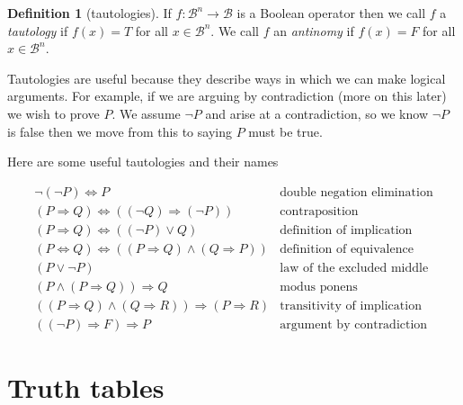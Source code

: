 \documentclass[
]{book}
\theoremstyle{definition}
\newtheorem{definition}{Definition}[chapter]
\theoremstyle{definition}
\theoremstyle{definition}
\theoremstyle{definition}
\theoremstyle{remark}
\begin{document}
\begin{definition}[tautologies]
If \(f: \mathcal{B}^n \rightarrow \mathcal{B}\) is a Boolean operator then we call \(f\) a \emph{tautology} if \(f(x) = T\) for all \(x \in \mathcal{B}^n\). We call \(f\) an \emph{antinomy} if \(f(x) = F\) for all \(x \in \mathcal{B}^n\).
\end{definition}

Tautologies are useful because they describe ways in which we can make logical arguments. For example, if we are arguing by contradiction (more on this later) we wish to prove \(P\). We assume \(\neg P\) and arise at a contradiction, so we know \(\neg P\) is false then we move from this to saying \(P\) must be true.

Here are some useful tautologies and their names

\begin{equation}
\begin{array}{lr}
\neg (\neg P) \Leftrightarrow P & \mbox{double negation elimination}\\
(P \Rightarrow Q) \Leftrightarrow ((\neg Q) \Rightarrow (\neg P)) & \mbox{contraposition}\\
(P \Rightarrow Q) \Leftrightarrow ((\neg P) \vee Q) & \mbox{definition of implication}\\
(P \Leftrightarrow Q) \Leftrightarrow ((P \Rightarrow Q) \wedge (Q \Rightarrow P)) & \mbox{definition of equivalence}\\
(P \vee \neg P) & \mbox{law of the excluded middle}\\
(P \wedge (P \Rightarrow Q)) \Rightarrow Q & \mbox{modus ponens}\\
((P \Rightarrow Q) \wedge (Q \Rightarrow R)) \Rightarrow (P \Rightarrow R) & \mbox{transitivity of implication}\\
((\neg P)\Rightarrow F)\Rightarrow P & \mbox{argument by contradiction}
\end{array}
\end{equation}

\section{Truth tables}\label{truth-tables}
\end{document}

